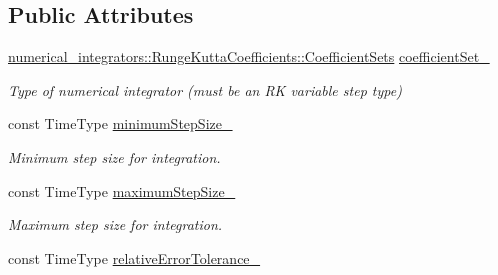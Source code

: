 \subsection*{Public Attributes}
\begin{DoxyCompactItemize}
\item 
\hyperlink{structtudat_1_1numerical__integrators_1_1RungeKuttaCoefficients_a462b6c2e353f7f84ce09e693fb6c7f17}{numerical\+\_\+integrators\+::\+Runge\+Kutta\+Coefficients\+::\+Coefficient\+Sets} \hyperlink{classtudat_1_1numerical__integrators_1_1RungeKuttaVariableStepSizeSettings_aa63544cda84018617216c7b1f62774a1}{coefficient\+Set\+\_\+}\hypertarget{classtudat_1_1numerical__integrators_1_1RungeKuttaVariableStepSizeSettings_aa63544cda84018617216c7b1f62774a1}{}\label{classtudat_1_1numerical__integrators_1_1RungeKuttaVariableStepSizeSettings_aa63544cda84018617216c7b1f62774a1}

\begin{DoxyCompactList}\small\item\em Type of numerical integrator (must be an RK variable step type) \end{DoxyCompactList}\item 
const Time\+Type \hyperlink{classtudat_1_1numerical__integrators_1_1RungeKuttaVariableStepSizeSettings_a3ae8eb99d3d46e02fa514e74c5ed9617}{minimum\+Step\+Size\+\_\+}
\begin{DoxyCompactList}\small\item\em Minimum step size for integration. \end{DoxyCompactList}\item 
const Time\+Type \hyperlink{classtudat_1_1numerical__integrators_1_1RungeKuttaVariableStepSizeSettings_a2a69bb81bd411c3da593816d1b9c8b43}{maximum\+Step\+Size\+\_\+}\hypertarget{classtudat_1_1numerical__integrators_1_1RungeKuttaVariableStepSizeSettings_a2a69bb81bd411c3da593816d1b9c8b43}{}\label{classtudat_1_1numerical__integrators_1_1RungeKuttaVariableStepSizeSettings_a2a69bb81bd411c3da593816d1b9c8b43}

\begin{DoxyCompactList}\small\item\em Maximum step size for integration. \end{DoxyCompactList}\item 
const Time\+Type \hyperlink{classtudat_1_1numerical__integrators_1_1RungeKuttaVariableStepSizeSettings_abf570603de3942b8825d3edaf4ca45f4}{relative\+Error\+Tolerance\+\_\+}\hypertarget{classtudat_1_1numerical__integrators_1_1RungeKuttaVariableStepSizeSettings_abf570603de3942b8825d3edaf4ca45f4}{}\label{classtudat_1_1numerical__integrators_1_1RungeKuttaVariableStepSizeSettings_abf570603de3942b8825d3edaf4ca45f4}


\end{DoxyCompactItemize}
